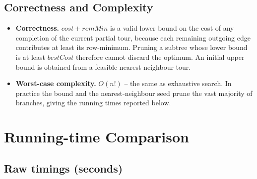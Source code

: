 \documentclass[11pt]{article}
\begin{document}
\subsection*{Correctness and Complexity}
\begin{itemize}
  \item \textbf{Correctness.} $\mathit{cost} + \mathit{remMin}$ is a valid
        lower bound on the cost of any completion of the current partial
        tour, because each remaining outgoing edge contributes at least its
        row-minimum.  Pruning a subtree whose lower bound is at least
        $\mathit{bestCost}$ therefore cannot discard the optimum.  An
        initial upper bound is obtained from a feasible nearest-neighbour
        tour.
  \item \textbf{Worst-case complexity.} $O(n!)$ -- the same as exhaustive
        search.  In practice the bound and the nearest-neighbour seed prune
        the vast majority of branches, giving the running times reported
        below.
\end{itemize}

\section{Running-time Comparison}

\subsection*{Raw timings (seconds)}
\end{document}
